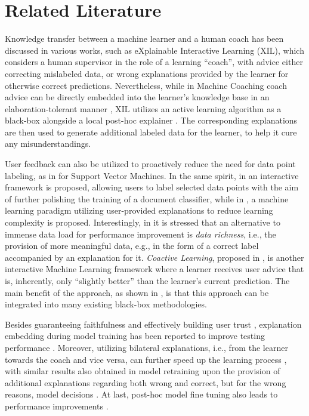 \documentclass[a4paper,twoside]{article}
\begin{document}
\section{Related Literature}\label{sec:related-literature}
%
Knowledge transfer between a machine learner and a human coach has been discussed in various works, such as eXplainable Interactive Learning (XIL), \cite{tesoKerstingIML2019} which considers a human supervisor in the role of a learning ``coach'', with advice either correcting mislabeled data, or wrong explanations provided by the learner for otherwise correct predictions. Nevertheless, while in Machine Coaching coach advice can be directly embedded into the learner's knowledge base in an elaboration-tolerant manner \cite{mccarthyElaborationTolerance1998}, XIL utilizes an active learning algorithm as a black-box \cite{Settles2009ActiveLL} alongside a local post-hoc explainer \cite{ribeiro2016}. The corresponding explanations are then used to generate additional labeled data for the learner, to help it cure any misunderstandings.

User feedback can also be utilized to proactively reduce the need for data point labeling, as in \cite{raghavanAllan2007} for Support Vector Machines. In the same spirit, in \cite{settles-2011-closing} an interactive framework is proposed, allowing users to label selected data points with the aim of further polishing the training of a document classifier, while in \cite{zaidan2007using}, a machine learning paradigm utilizing user-provided explanations to reduce learning complexity is proposed. Interestingly, in \cite{zaidan2007using} it is stressed that an alternative to immense data load for performance improvement is \emph{data richness}, i.e., the provision of more meaningful data, e.g., in the form of a correct label accompanied by an explanation for it. \emph{Coactive Learning}, proposed in \cite{shivaswamyJoachims2015}, is another interactive Machine Learning framework where a learner receives user advice that is, inherently, only ``slightly better'' than the learner's current prediction. The main benefit of the approach, as shown in \cite{shivaswamyJoachims2015}, is that this approach can be integrated into many existing black-box  methodologies.

Besides guaranteeing faithfulness and effectively building user trust \cite{BARREDOARRIETA202082}, explanation embedding during model training has been reported to improve testing performance \cite{Selvaraju_2019}. Moreover, utilizing bilateral explanations, i.e., from the learner towards the coach and vice versa, can further speed up the learning process \cite{dongSu2017}, with similar results also obtained in model retraining upon the provision of additional explanations regarding both wrong and correct, but for the wrong reasons, model decisions \cite{riegerSingh2019}. At last, post-hoc model fine tuning also leads to performance improvements \cite{ribeiro2016}.
\end{document}
